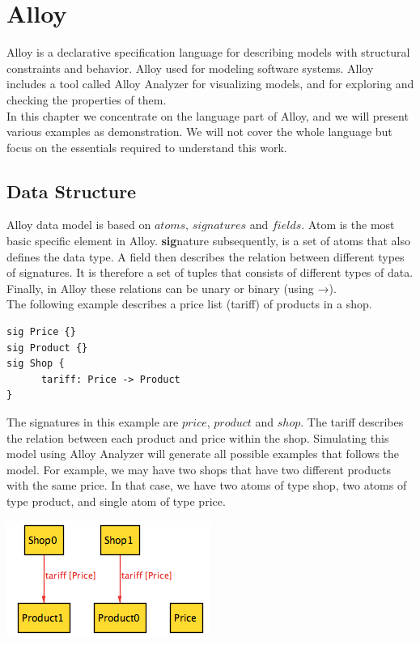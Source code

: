 \documentclass[oneside]{book}
\begin{document}
\newpage

\chapter{Alloy}

Alloy is a declarative specification language for describing models with structural constraints and behavior. Alloy used for modeling software systems. Alloy includes a tool called Alloy Analyzer for visualizing models, and for exploring and checking the properties of them.\\

In this chapter we concentrate on the language part of Alloy, and we will present various examples as demonstration. We will not cover the whole language but focus on the essentials required to understand this work.\\

\section{Data Structure}

Alloy data model is based on $atoms$, $signatures$ and $fields$. Atom is the most basic specific element in Alloy. \textbf{sig}nature subsequently, is a set of atoms that also defines the data type. A field then describes the relation between different types of signatures. It is therefore a set of tuples that consists of different types of data. Finally, in Alloy these relations can be unary or binary (using →).\\

The following example describes a price list (tariff) of products in a shop. 

\begin{lstlisting}
sig Price {}
sig Product {}
sig Shop {
	  tariff: Price -> Product
}
\end{lstlisting}

The signatures in this example are $price$, $product$ and $shop$. The tariff describes the relation between each product and price within the shop. Simulating this model using Alloy Analyzer will generate all possible examples that follows the model. For example, we may have two shops that have two different products with the same price. In that case, we have two atoms of type shop, two atoms of type product, and single atom of type price.

\begin{center}
\includegraphics[scale=0.6]{shops1}
\end{center}
\end{document}
